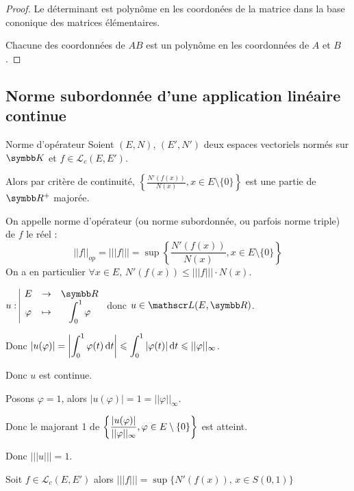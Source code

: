 \begin{proof}
    Le déterminant est polynôme en les coordonées de la matrice dans la base cononique des 
    matrices élémentaires. 

    \svspace Chacune des coordonnées de $AB$ est un polynôme en les coordonnées de $A$ et $B$.
\end{proof}

\subsection{Norme subordonnée d'une application linéaire continue}

\begin{definition}{Norme d'opérateur}{}
    Soient $(E, N)$, $(E', N')$ deux espaces vectoriels normés sur $\K$ et $f \in \mathscr L_c(E, E')$.

    \avspace Alors par critère de continuité, $\left\{ \frac{N'(f(x))}{N(x)}, x \in E \setminus \{0\} \right\}$ est
    une partie de $\R^+$ majorée. 

    On appelle norme d'opérateur (ou norme subordonnée, ou parfois norme triple) de $f$ le réel : 
    \[||f||_{op} = |||f||| = \sup \left\{\frac{N'(f(x))}{N(x)}, x \in E \setminus \{0\} \right\}\]
    On a en particulier $\forall x \in E, \, N'(f(x)) \leqslant |||f||| \cdot N(x)$.
\end{definition}

\begin{exemple}
    $\fonction u E \R \varphi {\int_0^1 \varphi}$ donc $u \in \mathscr L(E, \R)$. 

    \avspace Donc $\displaystyle |u(\varphi)| = \left| \int_0^1 \varphi(t) \,\mathrm{d}t \right| \leqslant \int_0^1 |\varphi(t)| \,\mathrm{d}t \leqslant ||\varphi||_\infty$.

    Donc $u$ est continue. 

    Posons $\varphi = 1$, alors $|u(\varphi)| = 1 = ||\varphi||_\infty$.

    Donc le majorant 1 de $\displaystyle \left\{ \frac{|u(\varphi)|}{||\varphi||_\infty}, \varphi \in E \setminus \{0\} \right\}$ est atteint. 

    Donc $|||u||| = 1$.
\end{exemple}

\begin{proposition}{}{}
    Soit $f \in \mathscr L_c(E, E')$ alors $|||f||| = \sup \{ N'(f(x)), \, x \in S(0, 1) \}$
\end{proposition}

